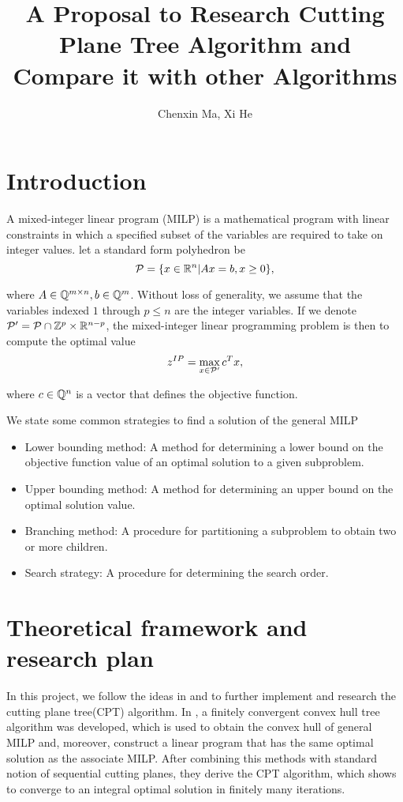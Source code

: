 \documentclass[a4paper,10pt]{article}
\title{A Proposal to Research Cutting Plane Tree Algorithm and Compare it with other Algorithms}
\author{Chenxin Ma, Xi He}
\begin{document}
\maketitle
 
\section{Introduction} 
A mixed-integer linear program (MILP) is a mathematical program with linear constraints in which a specified subset of the variables are required to 
take on integer values. let a standard form polyhedron be
\begin{equation}
 \mathcal P = \{x\in \mathbb{R}^n| Ax=b, x\geq 0\},
\end{equation}

where $A\in \mathbb{Q}^{m\times n},  b\in \mathbb{Q}^m$. Without loss of generality, we assume that the variables indexed $1$ through $p\leq n$ are the integer 
variables. If we denote $\mathcal P'=\mathcal P\cap \mathbb{Z}^p\times \mathbb{R}^{n-p}$, the mixed-integer linear programming problem is then to compute the optimal value
\begin{equation}
 z^{IP}=\max_{x\in \mathcal P'}c^Tx,
\end{equation}

where $c\in \mathbb{Q}^{n}$ is a vector that defines the objective function.

We state some common strategies to find a solution of the general MILP
\begin{itemize}
 \item  Lower bounding method: A method for determining a lower bound on the objective function value of an optimal solution to a given subproblem.
 \item Upper bounding method: A method for determining an upper bound on the optimal solution value.
 \item Branching method: A procedure for partitioning a subproblem to obtain two or more children.
 \item Search strategy: A procedure for determining the search order.
\end{itemize}

\section{Theoretical framework and research plan}
In this project, we follow the ideas in \cite{cpt11} and \cite{cpt12} to further implement and research the cutting plane tree(CPT) algorithm. In \cite{cpt11}, 
a finitely convergent convex hull tree algorithm was developed, which is used to obtain the convex hull of general MILP and, moreover, construct a linear 
program that has the same optimal solution as the associate MILP. After combining this methods with standard notion of sequential cutting planes, 
they derive the CPT algorithm, which shows to converge to an integral optimal solution in finitely many iterations.
\end{document}
